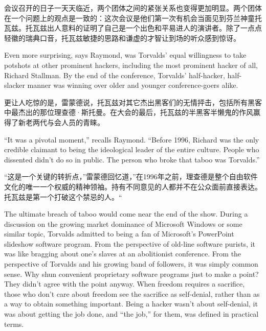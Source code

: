 \ifdefined\chs
会议召开的日子一天天临近，两个团体之间的紧张关系也变得更加明显。两个团体在一个问题上的观点是一致的：这次会议是他们第一次有机会当面见到芬兰神童托瓦兹。托瓦兹出人意料的证明了自己是一个出色和平易进人的演讲者。除了一点点轻徽的瑞典口音，托瓦兹敏捷的思路和谦虚的才智让到场的听众感到惊讶。 
\fi

\ifdefined\eng
Even more surprising, says Raymond, was Torvalds' equal willingness to take potshots at other prominent hackers, including the most prominent hacker of all, Richard Stallman. By the end of the conference, Torvalds' half-hacker, half-slacker manner was winning over older and younger conference-goers alike.
\fi

\ifdefined\chs
更让人吃惊的是，雷蒙德说，托瓦兹对其它杰出黑客们的无情抨击，包括所有黑客中最杰出的那位理查德·斯托曼。在大会的最后，托瓦兹的半黑客半懒鬼的作风赢得了新老两代与会人员的青睐。
\fi

\ifdefined\eng
``It was a pivotal moment,'' recalls Raymond. ``Before 1996, Richard was the only credible claimant to being the ideological leader of the entire culture. People who dissented didn't do so in public. The person who broke that taboo was Torvalds.''
\fi

\ifdefined\chs
“这是一个关键的转折点，”雷蒙德回忆道，”在1996年之前，理查德是整个自由软件文化的唯一一个权威的精神领袖。持有不同意见的人都并不在公众面前直接表达。托瓦兹是第一个打破这个禁忌的人。“
\fi

\ifdefined\eng
The ultimate breach of taboo would come near the end of the show. During a discussion on the growing market dominance of Microsoft Windows or some similar topic, Torvalds admitted to being a fan of Microsoft's PowerPoint slideshow software program. From the perspective of old-line software purists, it was like bragging about one's slaves at an abolitionist conference. From the perspective of Torvalds and his growing band of followers, it was simply common sense. Why shun convenient proprietary software programs just to make a point? They didn't agree with the point anyway. When freedom requires a sacrifice, those who don't care about freedom see the sacrifice as self-denial, rather than as a way to obtain something important.  Being a hacker wasn't about self-denial, it was about getting the job done, and ``the job,'' for them, was defined in practical terms.
\fi

